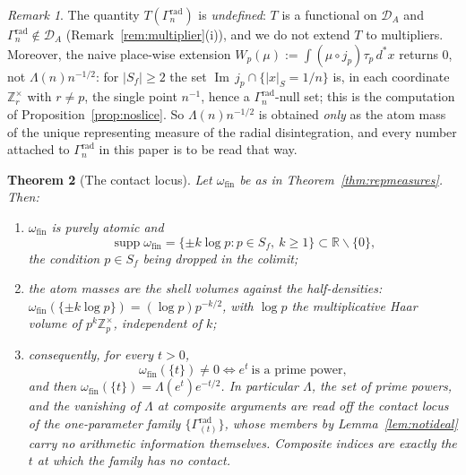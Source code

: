 \documentclass[11pt]{amsart}
\newtheorem{theorem}{Theorem}[section]
\theoremstyle{definition}
\theoremstyle{remark}
\newtheorem{remark}[theorem]{Remark}
\newcommand{\R}{\mathbb R}
\newcommand{\Z}{\mathbb Z}
\newcommand{\Iml}{\operatorname{Im}}
\newcommand{\supp}{\operatorname{supp}}
\newcommand{\DA}{\mathcal D_A}
\begin{document}
\begin{remark}\label{rem:typewarning}
The quantity $T(\Gamma_n^{\mathrm{rad}})$ is \emph{undefined}: $T$ is a
functional on $\DA$ and $\Gamma_n^{\mathrm{rad}}\notin\DA$
(Remark~\ref{rem:multiplier}(i)), and we do not extend $T$ to multipliers.
Moreover, the naive place-wise extension
$W_p(\mu):=\int(\mu\circ j_p)\tau_p\,d^*x$ returns $0$, not
$\Lambda(n)n^{-1/2}$: for $|S_f|\ge2$ the set
$\Iml\,j_p\cap\{|x|_S=1/n\}$ is, in each coordinate $\Z_r^\times$ with
$r\ne p$, the single point $n^{-1}$, hence a $\Gamma_n^{\mathrm{rad}}$-null
set; this is the computation of Proposition~\ref{prop:noslice}. So
$\Lambda(n)n^{-1/2}$ is obtained \emph{only} as the atom mass of the unique
representing measure of the radial disintegration, and every number attached to
$\Gamma_n^{\mathrm{rad}}$ in this paper is to be read that way.
\end{remark}

\begin{theorem}[The contact locus]\label{thm:contactlocus}
Let $\omega_{\mathrm{fin}}$ be as in Theorem~\ref{thm:repmeasures}. Then:
\begin{enumerate}
\item[(i)] $\omega_{\mathrm{fin}}$ is purely atomic and
\[
  \supp\omega_{\mathrm{fin}}=\{\pm k\log p:p\in S_f,\ k\ge1\}
   \subset\R\smallsetminus\{0\},
\]
the condition $p\in S_f$ being dropped in the colimit;
\item[(ii)] the atom masses are the shell volumes against the half-densities:
$\omega_{\mathrm{fin}}(\{\pm k\log p\})=(\log p)p^{-k/2}$, with $\log p$ the
multiplicative Haar volume of $p^k\Z_p^\times$, independent of $k$;
\item[(iii)] consequently, for every $t>0$,
\[
  \omega_{\mathrm{fin}}(\{t\})\ne0\iff e^t\ \text{is a prime power},
\]
and then $\omega_{\mathrm{fin}}(\{t\})=\Lambda(e^t)e^{-t/2}$. In particular
$\Lambda$, the set of prime powers, and the vanishing of $\Lambda$ at composite
arguments are read off the contact locus of the one-parameter family
$\{\Gamma^{\mathrm{rad}}_{(t)}\}$, whose members by Lemma~\ref{lem:notideal}
carry no arithmetic information themselves. Composite indices are exactly the $t$ at which the family
has \emph{no} contact.
\end{enumerate}
\end{theorem}
\end{document}
